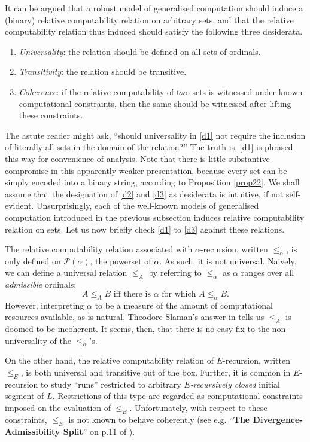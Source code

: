 \documentclass[12pt]{article}
\numberwithin{equation}{section}
\begin{document}
It can be argued that a robust model of generalised computation should induce a (binary) relative computability relation on arbitrary sets, and that the relative computability relation thus induced should satisfy the following three desiderata.
\begin{enumerate}[leftmargin=40pt, label=(D\arabic*)]
    \item\label{d1} \textit{Universality}: the relation should be defined on all sets of ordinals.
    \item\label{d2} \textit{Transitivity}: the relation should be transitive.
    \item\label{d3} \textit{Coherence}: if the relative computability of two sets is witnessed under known computational constraints, then the same should be witnessed after lifting these constraints.
\end{enumerate}
The astute reader might ask, ``should universality in \ref{d1} not require the inclusion of literally all sets in the domain of the relation?'' The truth is, \ref{d1} is phrased this way for convenience of analysis. Note that there is little substantive compromise in this apparently weaker presentation, because every set can be simply encoded into a binary string, according to Proposition \ref{prop22}. We shall assume that the designation of \ref{d2} and \ref{d3} as desiderata is intuitive, if not self-evident. Unsurprisingly, each of the well-known models of generalised computation introduced in the previous subsection induces relative computability relation on sets. Let us now briefly check \ref{d1} to \ref{d3} against these relations.

The relative computability relation associated with $\alpha$-recursion, written $\leq_{\alpha}$, is only defined on $\mathcal{P}(\alpha)$, the powerset of $\alpha$. As such, it is not universal. Naively, we can define a universal relation $\leq_A$ by referring to $\leq_{\alpha}$ as $\alpha$ ranges over all \textit{admissible} ordinals: $$A \leq_A B \text{ iff there is } \alpha \text{ for which } A \leq_{\alpha} B \text{.}$$ However, interpreting $\alpha$ to be a measure of the amount of computational resources available, as is natural, Theodore Slaman's answer in \cite{slaman} tells us $\leq_A$ is doomed to be incoherent. It seems, then, that there is no easy fix to the non-universality of the $\leq_{\alpha}$'s.

On the other hand, the relative computability relation of $E$-recursion, written $\leq_E$, is both universal and transitive out of the box. Further, it is common in $E$-recursion to study ``runs'' restricted to arbitrary $E$\textit{-recursively closed} initial segment of $L$. Restrictions of this type are regarded as computational constraints imposed on the evaluation of $\leq_E$. Unfortunately, with respect to these constraints, $\leq_E$ is not known to behave coherently (see e.g. ``\textbf{The Divergence-Admissibility Split}'' on p.11 of \cite{sackserec}).
\end{document}
